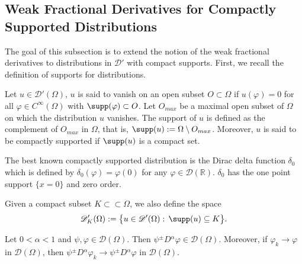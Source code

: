 \documentclass[leqno,final]{siamltex}
\numberwithin{equation}{section}
\renewcommand{\(}{\bigl(}
\renewcommand{\)}{\bigr)}
\newcommand{\R}{\mathbb{R}}
\begin{document}
 \subsection{Weak Fractional Derivatives for Compactly Supported Distributions}\label{sec-6.2}
The goal of this subsection is to extend the notion of the   weak fractional derivatives to 
distributions in $\mathscr{D}'$ with compact supports.  First, we recall the definition of
supports for distributions. 

\begin{definition}\label{supportD}
	Let  $u\in \mathscr{D}'(\Omega)$, $u$ is said to vanish on an open subset $O\subset \Omega$
	 if  $u(\varphi)=0$ for all $\varphi\in C^\infty (\Omega)$ with $\supp(\varphi)\subset  O$.  
	 Let $O_{max}$ be a maximal open subset of $\Omega$ on which the distribution $u$ vanishes. 
	 The support of $u$   is defined as the complement of $O_{max}$ in $\Omega$, that is,  
	 $\supp(u):=\Omega\setminus O_{max}$. 
	 Moreover, $u$ is said to be compactly supported if $\supp(u)$  is a compact set. 
\end{definition} 

The best known compactly supported distribution is the Dirac delta function $\delta_0$ which is defined
by $\delta_0(\varphi)=\varphi(0)$ for any $\varphi\in \mathscr{D}(\R)$. $\delta_0$ has the one point
support $\{x=0\}$ and zero order. 

Given a compact subset $K\subset\subset \Omega$, we also define the space 
\[
\mathscr{D}^\prime_K(\Omega):=\bigl\{ u\in \mathscr{D}'(\Omega):\, \supp(u)\subseteq K \bigr\}.
\]

    \begin{lemma}\label{cut_off}
        Let $0 < \alpha < 1$ and $\psi , \varphi \in \mathscr{D}(\Omega) $. Then $\psi {^{\pm}}{D}{^{\alpha}} \varphi \in \mathscr{D}(\Omega)$. Moreover, if $\varphi_k \rightarrow \varphi$ in $\mathscr{D}(\Omega)$, then $\psi {^{\pm}}{D}{^{\alpha}} \varphi_k \rightarrow \psi {^{\pm}}{D}{^{\alpha}} \varphi$ in $\mathscr{D}(\Omega)$.
    \end{lemma}
\end{document}

